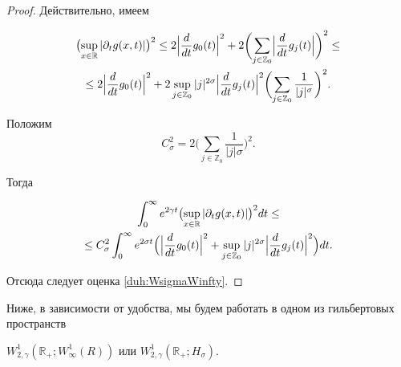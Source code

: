\begin{proof}

Действительно, имеем

\begin{multline*}

\bigl(\sup_{x\in \mathbb R}|\pa_tg(x,t)|\bigr)^2\le 

2\Bigl|\frac{d}{dt}g_0(t)\Bigr|^2+

2\biggl(\sum_{j\in \mathbb Z_0} \Bigl|\frac{d}{dt}g_j(t)\Bigr|\biggr)^2\le

\\

\le 2 

\Bigl|\frac{d}{dt}g_0(t)\Bigr|^2+2\sup_{j\in \mathbb Z_0} |j|^{2\sigma} 

\Bigl|\frac{d}{dt}g_j(t)\Bigr|^2 \biggl(\sum_{j\in \mathbb Z_0} \frac1{|j|^\sigma}\biggr)^2.

\end{multline*}

Положим $$C_\sigma^2=2 \biggl(\sum_{j\in \mathbb Z_0} \frac1{|j|\sigma}\biggr)^2.$$ 

Тогда

\begin{multline}

\int_0^\infty 

e^{2\gamma t} \bigl(\sup_{x\in \mathbb R}|\pa_tg(x,t)|\bigr)^2 dt\le 

\\

\le

C^2_\sigma

\int_0^\infty e^{2\sigma t} \Bigl(\Bigl|\frac{d}{dt}g_0(t)\Bigr|^2+\sup_{j\in \mathbb Z_0} |j|^{2\sigma} 

\Bigl|\frac{d}{dt}g_j(t)\Bigr|^2\Bigr) dt.

\end{multline}

Отсюда следует оценка \eqref{duh:WsigmaWinfty}.

\end{proof}



\smallskip



Ниже, в зависимости от удобства, мы будем работать в одном из гильбертовых пространств 

$W^1_{2,\gamma}(\mathbb R_{+}; W^1_\infty(R))$ или $W^1_{2,\gamma}(\mathbb R_{+}; H_{\sigma}).$ 



\smallskip



